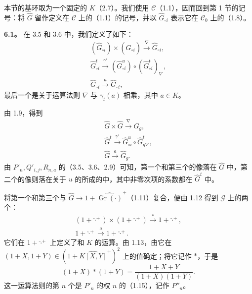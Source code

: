本节的基环取为一个固定的 $K$（2.7）。我们使用 $\mathscr C$（1.1），因而回到第 1 节的记号：将 $\widehat G$ 留作定义在 $\mathscr C$ 上的（1.1）的记号，并以 $\widehat G_{\circ i}$ 表示它在 $\mathscr C_0$ 上的（1.8）。

\textbf{6.1。} 在 3.5 和 3.6 中，我们定义了如下：
\[
\begin{gathered}
(\widehat G_{\circ i})\times(\widehat G_{\circ i})
 \xrightarrow{\nabla}\widehat G_{\circ i},\\
\widehat G^t_{\circ i}\xrightarrow{\gamma'}
 (\widehat G^u_{\circ i})\circ(\widehat G^t_{\circ i})_{\nabla},\\
\widehat G_{\circ i}\xrightarrow{a}\widehat G_{\circ i},
\end{gathered}
\]
最后一个是关于运算法则 $\nabla$ 与 $\gamma_t(a)$ 相乘，其中 $a\in K$。

由 1.9，得到
\[
\begin{gathered}
\widehat G\times\widehat G\xrightarrow{\nabla}\widehat G_g,\\
\widehat G^t\xrightarrow{\gamma'}
 \widehat G^u_{\circ i}\circ\widehat G^t_{g\nabla},\\
\widehat G\xrightarrow{a}\widehat G_g.
\end{gathered}
\]
由 $P'_n,Q'_{i,j},R_{n,a}$ 的（3.5、3.6、2.9）可知，第一个和第三个的像落在 $\widehat G$ 中，第二个的像则落在关于 $u$ 的所成的中，其中非零次项的系数都在 $\widehat G^t$ 中。

将第一个和第三个与
$\widehat G\longrightarrow1+\widehat{\operatorname{Gr}(\cdot)}^+$（1.11）复合，便由 1.12 得到 $\mathscr G$ 上的两个：
\[
\begin{gathered}
(1+\widehat{\cdot}^{+})\times(1+\widehat{\cdot}^{+})
 \xrightarrow{*}1+\widehat{\cdot}^{+},\\
1+\widehat{\cdot}^{+}\xrightarrow{a}1+\widehat{\cdot}^{+}.
\end{gathered}
\]
它们在 $1+\widehat{\cdot}^{+}$ 上定义了和 $K$ 的运算。由 1.13，由它在
$(1+X,1+Y)\in(1+\widehat{K[X,Y]}^+)^2$ 上的值确定；将它记作 $*$，于是
\[
(1+X)*(1+Y)=\frac{1+X+Y}{(1+X)(1+Y)}.
\tag{6.1.1}
\]
这一运算法则的第 $n$ 个是 $P'_n$ 的权 $n$ 的（1.15），记作 $P''_n$。


